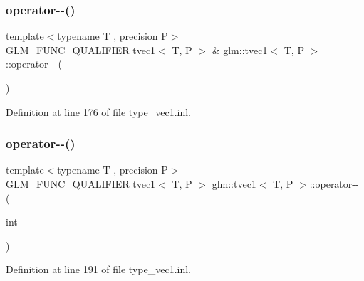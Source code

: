 \mbox{\label{structglm_1_1tvec1_ae2afe02d40b7a469d33543f16307611a}} 
\subsubsection{\texorpdfstring{operator-\/-\/()}{operator--()}\hspace{0.1cm}{\footnotesize\ttfamily [1/2]}}
{\footnotesize\ttfamily template$<$typename T , precision P$>$ \\
\mbox{\hyperlink{setup_8hpp_a33fdea6f91c5f834105f7415e2a64407}{G\+L\+M\+\_\+\+F\+U\+N\+C\+\_\+\+Q\+U\+A\+L\+I\+F\+I\+ER}} \mbox{\hyperlink{structglm_1_1tvec1}{tvec1}}$<$ T, P $>$ \& \mbox{\hyperlink{structglm_1_1tvec1}{glm\+::tvec1}}$<$ T, P $>$\+::operator-\/-\/ (\begin{DoxyParamCaption}{ }\end{DoxyParamCaption})}



Definition at line 176 of file type\+\_\+vec1.\+inl.

\mbox{\label{structglm_1_1tvec1_af4251163c1a4e5a83e2c09e4dd685ecd}} 
\subsubsection{\texorpdfstring{operator-\/-\/()}{operator--()}\hspace{0.1cm}{\footnotesize\ttfamily [2/2]}}
{\footnotesize\ttfamily template$<$typename T , precision P$>$ \\
\mbox{\hyperlink{setup_8hpp_a33fdea6f91c5f834105f7415e2a64407}{G\+L\+M\+\_\+\+F\+U\+N\+C\+\_\+\+Q\+U\+A\+L\+I\+F\+I\+ER}} \mbox{\hyperlink{structglm_1_1tvec1}{tvec1}}$<$ T, P $>$ \mbox{\hyperlink{structglm_1_1tvec1}{glm\+::tvec1}}$<$ T, P $>$\+::operator-\/-\/ (\begin{DoxyParamCaption}\item[{int}]{ }\end{DoxyParamCaption})}



Definition at line 191 of file type\+\_\+vec1.\+inl.

